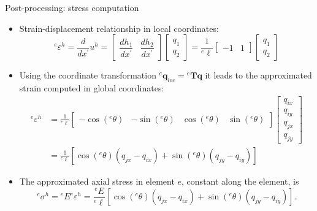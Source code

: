 \documentclass[aspectratio=169]{beamer}
\begin{document}
\begin{frame}{Post-processing: stress computation}
  \begin{itemize}

    \item Strain-displacement relationship in local coordinates:
          $${}^e\varepsilon^h=\frac{d}{dx^\prime}u^h= \begin{bmatrix}  \dfrac{d h_1}{dx^\prime}  & \dfrac{d h_2}{dx^\prime} \end{bmatrix} \begin{bmatrix}  q_1 \\ q_2\end{bmatrix}=\frac{1}{{}^e\ell}\begin{bmatrix} -1  & 1 \end{bmatrix} \begin{bmatrix}  q_1 \\ q_2\end{bmatrix}$$
    \item Using the coordinate transformation ${}^e\mathbf q_{loc}={}^e\mathbf T\mathbf q$ it leads to the approximated strain computed in global coordinates:\vspace{-0.3cm}
          \begin{align*}
            {}^e\varepsilon^h & =\frac{1}{{}^e\ell}\begin{bmatrix} -\cos({}^e\theta)  & -\sin({}^e\theta) & \cos({}^e\theta) & \sin({}^e\theta) \end{bmatrix} \begin{bmatrix}
                                                                                                                                                                q_{ix} \\ q_{iy} \\ q_{jx} \\ q_{jy}
                                                                                                                                                              \end{bmatrix} \\
                              & =
            \frac{1}{{}^e\ell} \left[
              \cos({}^e\theta)(q_{jx} - q_{ix}) + \sin({}^e\theta)(q_{jy} - q_{iy})
              \right]
          \end{align*}
    \item The approximated axial stress in element $e$, constant along the element, is
          $${}^e\sigma^h={}^eE{}^e\varepsilon^h=\frac{{}^eE}{{}^e\ell} \left[
              \cos({}^e\theta)(q_{jx} - q_{ix}) + \sin({}^e\theta)(q_{jy} - q_{iy})
              \right].$$
  \end{itemize}
\end{frame}
\end{document}
